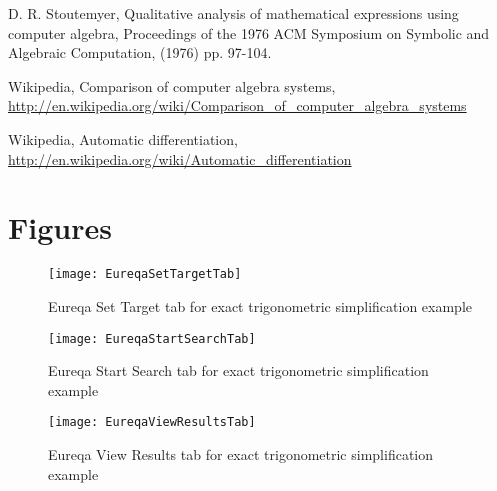 \documentclass[12pt,english]{article}
\begin{document}
\begin{thebibliography}{14}
D. R. Stoutemyer, Qualitative analysis
of mathematical expressions using computer algebra, Proceedings of
the 1976 ACM Symposium on Symbolic and Algebraic Computation, (1976)
pp. 97-104.\vspace{-5pt}


Wikipedia, Comparison of computer algebra
systems,\\
 \url{http://en.wikipedia.org/wiki/Comparison_of_computer_algebra_systems}\vspace{-5pt}


Wikipedia, Automatic differentiation,
\url{http://en.wikipedia.org/wiki/Automatic_differentiation}

\end{thebibliography}

\section*{Figures}

\begin{figure}[H]
\noindent \centering{}\caption{Eureqa \textsf{Set Target }tab for exact trigonometric simplification
example}
\label{Flo:SetTargetTab}\texttt{[image: EureqaSetTargetTab]}
\end{figure}


\noindent \begin{center}
\begin{figure}[H]
\caption{Eureqa \textsf{Start Search }tab for exact trigonometric simplification
example}


\texttt{[image: EureqaStartSearchTab]}\label{Flo:StartSearchTab}
\end{figure}

\par\end{center}

\begin{figure}[H]
\noindent \centering{}\caption{Eureqa \textsf{View Results }tab for exact trigonometric simplification
example}
\label{Flo:ViewResultsTab}\texttt{[image: EureqaViewResultsTab]}
\end{figure}
\end{document}
